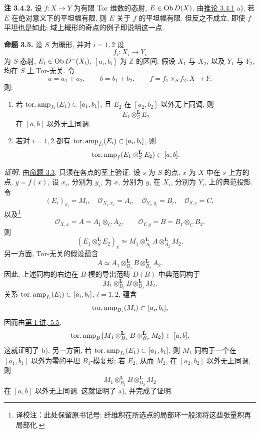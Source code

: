 \textbf{注 3.4.2.} 设 \(f:X\to Y\) 为有限 Tor 维数的态射, \(E\in \operatorname{Ob} D(X)\). 由\hyperlink{sga6.e03.cor.3-4-1}{推论 3.4.1} a), 若 \(E\) 在绝对意义下的平坦幅有限, 则 \(E\) 关于 \(f\) 的平坦幅有限. 但反之不成立, 即使 \(f\) 平坦也是如此; 域上概形的奇点的例子即说明这一点.

\textbf{命题 3.5.} 设 \(S\) 为概形, 并对 \(i=1,2\) 设
\[
  f_i:X_i\longrightarrow Y_i
\]
为 \(S\)-态射, \(E_i\in \operatorname{Ob} D^{-}(X_i)\), \([a_i,b_i]\) 为 \(\mathbb Z\) 的区间. 假设 \(X_1\) 与 \(X_2\), 以及 \(Y_1\) 与 \(Y_2\), 均在 \(S\) 上 Tor-无关. 令
\[
  a=a_1+a_2,\qquad b=b_1+b_2,\qquad
  f=f_1\times_S f_2:X\to Y.
\]
则:
\begin{enumerate}[label=\alph*)]
\item 若 \(\operatorname{tor.amp}_{f_1}(E_1)\subset[a_1,b_1]\), 且 \(E_2\) 在 \([a_2,b_2]\) 以外无上同调, 则
\[
  E_1\otimes_S^{\mathbf L}E_2
\]
在 \([a,b]\) 以外无上同调.

\item 若对 \(i=1,2\) 都有 \(\operatorname{tor.amp}_{f_i}(E_i)\subset[a_i,b_i]\), 则
\[
  \operatorname{tor.amp}_f(E_1\otimes_S^{\mathbf L}E_2)\subset[a,b].
\]
\end{enumerate}

\emph{证明.} 由\hyperlink{sga6.e03.prop.3-3}{命题 3.3}, 只须在各点的茎上验证. 设 \(s\) 为 \(S\) 的点, \(x\) 为 \(X\) 中在 \(s\) 上方的点, \(y=f(x)\), 设 \(x_i\), 分别为 \(y_i\), 为 \(x\), 分别为 \(y\), 在 \(X_i\), 分别为 \(Y_i\), 上的典范投影. 令
\[
  (E_i)_{x_i}=M_i,\quad
  \mathcal O_{X_i,x_i}=A_i,\quad
  \mathcal O_{Y_i,y_i}=B_i,\quad
  \mathcal O_{S,s}=C,
\]
以及\footnote{译校注：此处保留原书记号; 纤维积在所选点的局部环一般须将这些张量积再局部化.}
\[
  \mathcal O_{X,x}=A=A_1\otimes_C A_2,\qquad
  \mathcal O_{Y,y}=B=B_1\otimes_C B_2.
\]
则
\[
  (E_1\otimes_S^{\mathbf L}E_2)_x
  \simeq
  M_1\otimes_{A_1}^{\mathbf L} A
  \otimes_{A_2}^{\mathbf L} M_2.
\]
另一方面, Tor-无关的假设蕴含
\[
  A\simeq A_1\otimes_{B_1}^{\mathbf L}B
       \otimes_{B_2}^{\mathbf L}A_2.
\]
因此, 上述同构的右边在 \(B\)-模的导出范畴 \(D(B)\) 中典范同构于
\[
  M_1\otimes_{B_1}^{\mathbf L}B
       \otimes_{B_2}^{\mathbf L}M_2.
\]
关系 \(\operatorname{tor.amp}_{f_i}(E_i)\subset[a_i,b_i]\), \(i=1,2\), 蕴含
\[
  \operatorname{tor.amp}_{B_i}(M_i)\subset[a_i,b_i],
\]
因而由\hyperlink{sga6.e01.para.5-5}{第 I 讲, 5.5},
\[
  \operatorname{tor.amp}_B\bigl(M_1\otimes_{B_1}^{\mathbf L}B
  \otimes_{B_2}^{\mathbf L}M_2\bigr)\subset[a,b],
\]
这就证明了 b). 另一方面, 若 \(\operatorname{tor.amp}_{f_1}(E_1)\subset[a_1,b_1]\), 则 \(M_1\) 同构于一个在 \([a_1,b_1]\) 以外为零的平坦 \(B_1\)-模复形; 若 \(E_2\), 从而 \(M_2\), 在 \([a_2,b_2]\) 以外无上同调, 则
\[
  M_1\otimes_{B_1}^{\mathbf L}B\otimes_{B_2}^{\mathbf L}M_2
\]
在 \([a,b]\) 以外无上同调. 这就证明了 a), 并完成了证明.

